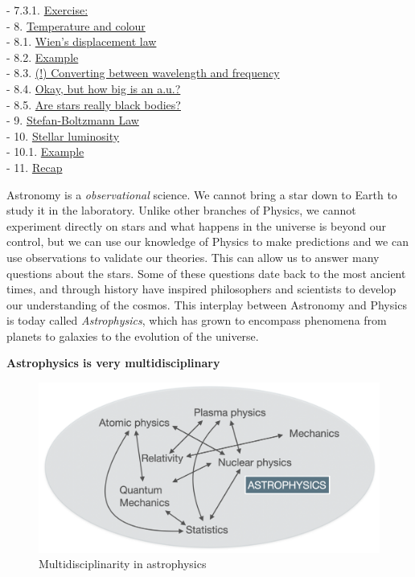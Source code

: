 \documentclass[
  letterpaper,
  DIV=11,
  numbers=noendperiod]{scrreprt}
\begin{document}
- 7.3.1. \protect\hyperlink{toc7_3_1_}{Exercise:}\\
- 8. \protect\hyperlink{toc8_}{Temperature and colour}\\
- 8.1. \protect\hyperlink{toc8_1_}{Wien's displacement law}\\
- 8.2. \protect\hyperlink{toc8_2_}{Example}\\
- 8.3. \protect\hyperlink{toc8_3_}{(!) Converting between wavelength and
frequency}\\
- 8.4. \protect\hyperlink{toc8_4_}{Okay, but how big is an a.u.?}\\
- 8.5. \protect\hyperlink{toc8_5_}{Are stars really black bodies?}\\
- 9. \protect\hyperlink{toc9_}{Stefan-Boltzmann Law}\\
- 10. \protect\hyperlink{toc10_}{Stellar luminosity}\\
- 10.1. \protect\hyperlink{toc10_1_}{Example}\\
- 11. \protect\hyperlink{toc11_}{Recap}

Astronomy is a \emph{observational} science. We cannot bring a star down
to Earth to study it in the laboratory. Unlike other branches of
Physics, we cannot experiment directly on stars and what happens in the
universe is beyond our control, but we can use our knowledge of Physics
to make predictions and we can use observations to validate our
theories. This can allow us to answer many questions about the stars.
Some of these questions date back to the most ancient times, and through
history have inspired philosophers and scientists to develop our
understanding of the cosmos. This interplay between Astronomy and
Physics is today called \emph{Astrophysics}, which has grown to
encompass phenomena from planets to galaxies to the evolution of the
universe.

\textbf{Astrophysics is very multidisciplinary}

\begin{figure}

{\centering \includegraphics{img/astrophysics_multidisciplinary.png}

}

\caption{Multidisciplinarity in astrophysics}

\end{figure}
\end{document}
